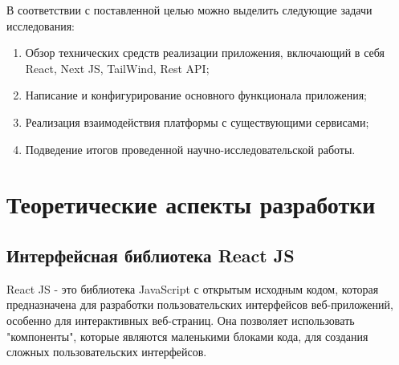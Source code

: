 \documentclass[master, och, pract]{SCWorks}
\begin{document}
В соответствии с поставленной целью можно выделить следующие задачи исследования: 
\begin{enumerate}
    \item Обзор технических средств реализации приложения, включающий в себя React, Next JS, TailWind, Rest API;
    \item Написание и конфигурирование основного функционала приложения;
    \item Реализация взаимодействия платформы с существующими сервисами;
    \item Подведение итогов проведенной научно-исследовательской работы.
\end{enumerate}




\newpage
\section{Теоретические аспекты разработки}
\subsection{Интерфейсная библиотека React JS}
React JS - это библиотека JavaScript с открытым исходным кодом, которая предназначена для разработки пользовательских интерфейсов веб-приложений, особенно для интерактивных веб-страниц. Она позволяет использовать "компоненты", которые являются маленькими блоками кода, для создания сложных пользовательских интерфейсов.
\end{document}
